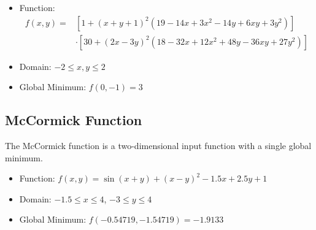 \begin{itemize}
  \item Function:
    \begin{align}
      f(x,y) =& \left[1+(x+y+1)^2\left(19-14x+3x^2-14y+6xy+3y^2\right)\right] \\ \nonumber
        & \cdot\left[30+(2x-3y)^2(18-32x+12x^2+48y-36xy+27y^2)\right]
    \end{align}
  \item Domain: $-2 \leq x,y \leq 2$
  \item Global Minimum: $f(0,-1)=3$
\end{itemize}

\subsection{McCormick Function}
The McCormick function is a two-dimensional input function with a single global minimum.

\begin{itemize}
  \item Function: $f(x,y) = \sin(x+y) + (x-y)^2 - 1.5x + 2.5y + 1$
  \item Domain: $-1.5 \leq x \leq 4$, $-3 \leq y \leq 4$
  \item Global Minimum: $f(-0.54719,-1.54719) = -1.9133$
\end{itemize}
